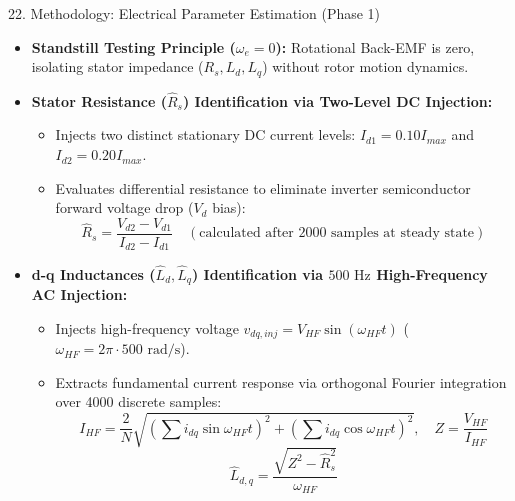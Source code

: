 \documentclass[aspectratio=169]{beamer}
\begin{document}
\begin{frame}{22. Methodology: Electrical Parameter Estimation (Phase 1)}
    \begin{itemize}
        \item \textbf{Standstill Testing Principle ($\omega_e = 0$):} Rotational Back-EMF is zero, isolating stator impedance ($R_s, L_d, L_q$) without rotor motion dynamics.
        \item \textbf{Stator Resistance ($\hat{R}_s$) Identification via Two-Level DC Injection:}
        \begin{itemize}
            \item Injects two distinct stationary DC current levels: $I_{d1} = 0.10 I_{max}$ and $I_{d2} = 0.20 I_{max}$.
            \item Evaluates differential resistance to eliminate inverter semiconductor forward voltage drop ($V_d$ bias):
            \begin{equation}
                \hat{R}_s = \frac{V_{d2} - V_{d1}}{I_{d2} - I_{d1}} \quad (\text{calculated after 2000 samples at steady state})
            \end{equation}
        \end{itemize}
        \item \textbf{d-q Inductances ($\hat{L}_d, \hat{L}_q$) Identification via $500\text{ Hz}$ High-Frequency AC Injection:}
        \begin{itemize}
            \item Injects high-frequency voltage $v_{dq,inj} = V_{HF} \sin(\omega_{HF} t)$ ($\omega_{HF} = 2\pi \cdot 500\text{ rad/s}$).
            \item Extracts fundamental current response via orthogonal Fourier integration over 4000 discrete samples:
            \begin{equation}
                I_{HF} = \frac{2}{N} \sqrt{\left(\sum i_{dq} \sin\omega_{HF} t\right)^2 + \left(\sum i_{dq} \cos\omega_{HF} t\right)^2}, \quad Z = \frac{V_{HF}}{I_{HF}}
            \end{equation}
            \begin{equation}
                \hat{L}_{d,q} = \frac{\sqrt{Z^2 - \hat{R}_s^2}}{\omega_{HF}}
            \end{equation}
        \end{itemize}
    \end{itemize}
\end{frame}
\end{document}
